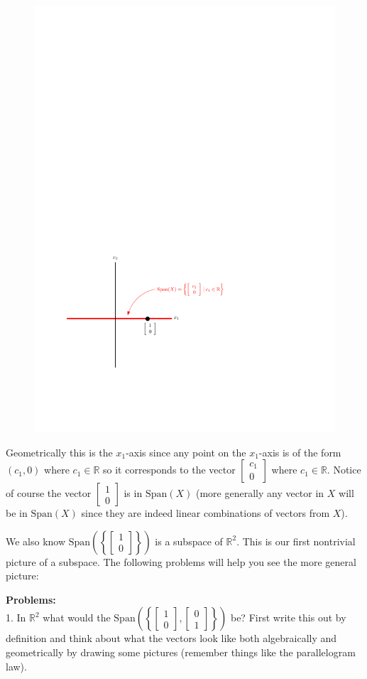 \documentclass[12pt]{article}
\begin{document}
\begin{figure}[h!]
\begin{center} 
\includegraphics[width=0.6 \textwidth]{l19comim3}
\end{center}
\end{figure} 


Geometrically this is the $x_1$-axis since any point on the $x_1$-axis is of the form $(c_1,0)$ where $c_1\in \mathbb{R}$ so it corresponds to the vector $\left[ \begin{array}{c} c_1  \\ 0  \end{array} \right]$ where  $c_1\in \mathbb{R}$.  Notice of course the vector $\left[ \begin{array}{c} 1  \\ 0  \end{array} \right]$ is in $\text{Span}(X)$ (more generally any vector in $X$ will be in $\text{Span}(X)$ since they are indeed linear combinations of vectors from $X$).

We also know $\text{Span}\left ( \left \{ \left[ \begin{array}{c} 1  \\ 0  \end{array} \right] \right\} \right )$ is a subspace of $\mathbb{R}^2$.  This is our first nontrivial picture of a subspace.  The following problems will help you see the more general picture:

{\bf Problems:}\\
1. In $\mathbb{R}^2$ what would the $\text{Span}(\left \{ \left[ \begin{array}{c} 1  \\ 0  \end{array} \right] , \left[ \begin{array}{c} 0  \\ 1  \end{array} \right]\right\})$ be?  First write this out by definition and think about what the vectors look like both algebraically and geometrically by drawing some pictures (remember things like the parallelogram law). \\
\end{document}
